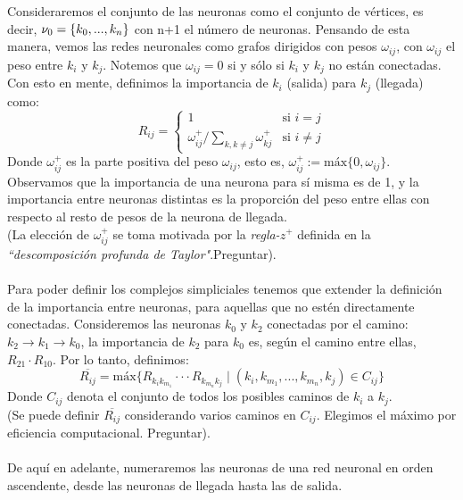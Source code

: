 \documentclass[12pt]{article}
\numberwithin{equation}{section}
\theoremstyle{definition}
\theoremstyle{remark}
\theoremstyle{plain}
\begin{document}
		Consideraremos el conjunto de las neuronas como el conjunto de vértices, es decir, ${\Large \nu}_{0}=\{k_{0},...,k_{n}\}$ con n+1 el número de neuronas. Pensando de esta manera, vemos las redes
		neuronales como grafos dirigidos con pesos $\omega_{ij}$, con $\omega_{ij}$ el peso entre $k_{i}$ y $k_{j}$. Notemos que $\omega_{ij}=0$ si y sólo si $k_{i}$ y $k_{j}$ no están conectadas.
		Con esto en mente, definimos la importancia de $k_{i}$ (salida) para $k_{j}$ (llegada) como:
		\begin{equation}
			R_{ij}=  \left \{ 
				\begin{array}{ll}
					1 & \text{si } i=j \\
					\omega_{ij}^{+}/\sum_{k,k \neq j}\omega_{kj}^{+} & \text{si } i \neq j
				\end{array}
			\right. 
		\end{equation}
		Donde $\omega_{ij}^{+}$ es la parte positiva del peso $\omega_{ij}$, esto es, $\omega_{ij}^{+}:=\text{máx}\{0,\omega_{ij}\}$.\\ 
		Observamos que la importancia de una neurona para sí misma es de 1, y la importancia entre neuronas distintas es la proporción del peso entre ellas con respecto 
		al resto de pesos de la neurona de llegada.\\
		(La elección de $\omega_{ij}^{+}$ se toma motivada por la \textit{regla-}$z^{+}$ definida en la 
		\textit{``descomposición profunda de Taylor"}.Preguntar). \\
		\\
		Para poder definir los complejos simpliciales tenemos que extender la definición de la importancia entre neuronas, para aquellas que no estén directamente conectadas. Consideremos 
		las neuronas $k_{0}$ y $k_{2}$ conectadas por el camino: $k_{2} \rightarrow k_{1} \rightarrow k_{0}$, la importancia de $k_{2}$ para $k_{0}$ es, según el camino entre ellas, $R_{21} \cdot R_{10}$.
		Por lo tanto, definimos:
		\begin{equation}
			\overline{R_{ij}}=\text{máx}\{R_{k_{i}k_{m_{1}}} \cdot\cdot\cdot R_{k_{m_{n}}k_{j}} \mid (k_{i},k_{m_{1}},...,k_{m_{n}},k_{j}) \in C_{ij} \}
			\label{def:ie}
		\end{equation}	
		Donde $C_{ij}$ denota el conjunto de todos los posibles caminos de $k_{i}$ a $k_{j}$. \\
		(Se puede definir $\overline{R_{ij}}$ considerando varios caminos en $C_{ij}$. Elegimos el máximo 
		por eficiencia computacional. Preguntar). \\
		\\
		De aquí en adelante, numeraremos las neuronas de una red neuronal en orden ascendente, desde las neuronas de llegada hasta las de salida.\\
		
\end{document}

